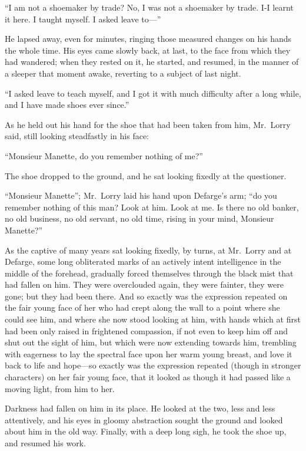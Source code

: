 ``I am not a shoemaker by trade?  No, I was not a shoemaker by trade.
I-I learnt it here.  I taught myself.  I asked leave to---''

He lapsed away, even for minutes, ringing those measured changes on
his hands the whole time.  His eyes came slowly back, at last, to the
face from which they had wandered; when they rested on it, he started,
and resumed, in the manner of a sleeper that moment awake,
reverting to a subject of last night.

``I asked leave to teach myself, and I got it with much difficulty
after a long while, and I have made shoes ever since.''

As he held out his hand for the shoe that had been taken from him,
Mr.\ Lorry said, still looking steadfastly in his face:

``Monsieur Manette, do you remember nothing of me?''

The shoe dropped to the ground, and he sat looking fixedly at the
questioner.

``Monsieur Manette''; Mr.\ Lorry laid his hand upon Defarge's arm;
``do you remember nothing of this man?  Look at him.  Look at me.
Is there no old banker, no old business, no old servant, no old time,
rising in your mind, Monsieur Manette?''

As the captive of many years sat looking fixedly, by turns, at
Mr.\ Lorry and at Defarge, some long obliterated marks of an actively
intent intelligence in the middle of the forehead, gradually forced
themselves through the black mist that had fallen on him.  They were
overclouded again, they were fainter, they were gone; but they had
been there.  And so exactly was the expression repeated on the fair
young face of her who had crept along the wall to a point where she
could see him, and where she now stood looking at him, with hands
which at first had been only raised in frightened compassion, if not
even to keep him off and shut out the sight of him, but which were
now extending towards him, trembling with eagerness to lay the
spectral face upon her warm young breast, and love it back to life
and hope---so exactly was the expression repeated (though in stronger
characters) on her fair young face, that it looked as though it had
passed like a moving light, from him to her.

Darkness had fallen on him in its place.  He looked at the two, less
and less attentively, and his eyes in gloomy abstraction sought the
ground and looked about him in the old way.  Finally, with a deep
long sigh, he took the shoe up, and resumed his work.

